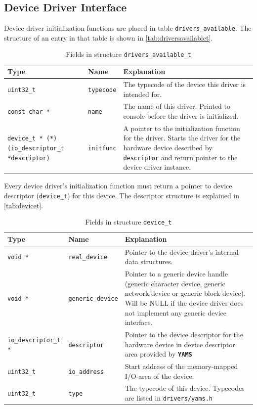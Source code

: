 \documentclass[twoside,a4paper]{report}
\newcommand{\PBS}[1]{\let\temp=\\#1\let\\=\temp}
\newlength{\tablewidth}
\newenvironment{structdescription}{%
\begin{center}%
\begin{tabular}{p{3.5cm}|p{2.5cm}|>{\PBS\raggedright}p{\tablewidth-6\tabcolsep-6cm}}%
\textbf{Type} & \textbf{Name} & \textbf{Explanation} \\ %
}{%
\end{tabular}%
\end{center}%
}
\newcommand{\structfield}[3]{%
\hline%
\texttt{#1} & \texttt{#2} & #3 \\%
}
\newcommand{\yams}{\texttt{\textbf{YAMS}}}
\begin{document}
\subsection{Device Driver Interface}

Device driver initialization functions are placed in table
\texttt{drivers\_available}.
The structure of an entry in that table is shown in
\autoref{tab:driversavailablet}.

\begin{table}
\begin{structdescription}

\structfield{uint32\_t}{typecode}{The typecode of the device this
  driver is intended for.}

\structfield{const char *}{name}{The name of this driver. Printed to
  console before the driver is initialized.}

\structfield{device\_t * (*)(io\_descriptor\_t
  *descriptor)}{initfunc}{A pointer to the initialization function for
  the driver. Starts the driver for the hardware device described by
  \texttt{descriptor} and return pointer to the device driver
  instance.}

\end{structdescription}
\caption{Fields in structure \texttt{drivers\_available\_t}}
\label{tab:driversavailablet}
\end{table}

Every device driver's initialization function must return a pointer to
device descriptor
(\texttt{device\_t}) for this
device. The descriptor structure is explained in
\autoref{tab:devicet}.

\begin{table}
\begin{structdescription}

\structfield{void *}{real\_device}{Pointer to the device driver's internal
data structures.}

\structfield{void *}{generic\_device}{Pointer to a generic device
handle (generic character device, generic network device or generic
block device). Will be NULL if the device driver does not implement
any generic device interface.}

\structfield{io\_descriptor\_t *}{descriptor}{Pointer to the device
descriptor for the hardware device in device descriptor area provided
by \yams{}}

\structfield{uint32\_t}{io\_address}{Start address of the
memory-mapped I/O-area of the device.}

\structfield{uint32\_t}{type}{The typecode of this device. Typecodes
are listed in \texttt{drivers/yams.h}}

\end{structdescription}
\caption{Fields in structure \texttt{device\_t}}
\label{tab:devicet}
\end{table}
\end{document}

